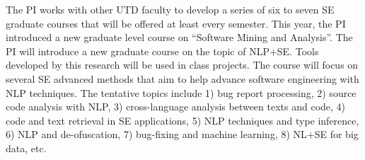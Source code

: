  The PI works
with other UTD faculty to develop a series of six to seven SE graduate
courses that will be offered at least every semester. This year, the
PI introduced a new graduate level course on ``Software Mining and
Analysis''. The PI will introduce a new graduate course on the topic
of NLP+SE. Tools developed by this research will be used in class
projects. The course will focus on several SE advanced methods that
aim to help advance software engineering with NLP techniques. The
tentative topics include 1) bug report processing, 2) source code
analysis with NLP, 3) cross-language analysis between texts and code,
4) code and text retrieval in SE applications, 5) NLP techniques and
type inference, 6) NLP and de-ofuscation, 7) bug-fixing and
machine learning, 8) NL+SE for big data, etc.







